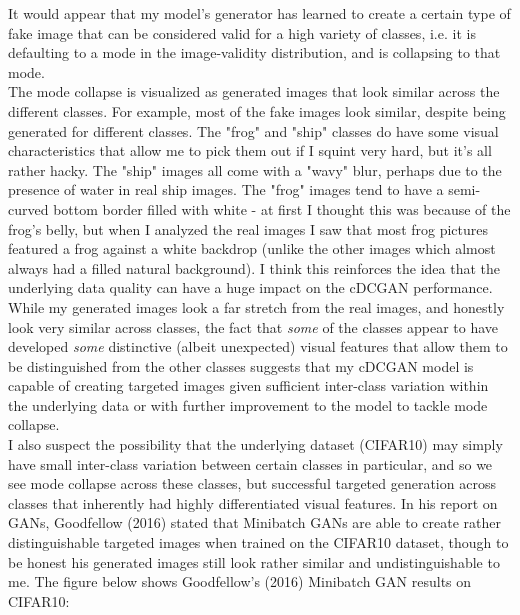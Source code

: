 \documentclass[11pt]{article}
\begin{document}
It would appear that my model's generator has learned to create a
certain type of fake image that can be considered valid for a high
variety of classes, i.e. it is defaulting to a mode in the
image-validity distribution, and is collapsing to that mode.\\

The mode collapse is visualized as generated images that look similar
across the different classes. For example, most of the fake images look
similar, despite being generated for different classes. The "frog" and
"ship" classes do have some visual characteristics that allow me to pick
them out if I squint very hard, but it's all rather hacky. The "ship"
images all come with a "wavy" blur, perhaps due to the presence of water
in real ship images. The "frog" images tend to have a semi-curved bottom
border filled with white - at first I thought this was because of the
frog's belly, but when I analyzed the real images I saw that most frog
pictures featured a frog against a white backdrop (unlike the other
images which almost always had a filled natural background). I think
this reinforces the idea that the underlying data quality can have a
huge impact on the cDCGAN performance.\\

While my generated images look a far stretch from the real images, and
honestly look very similar across classes, the fact that \emph{some} of
the classes appear to have developed \emph{some} distinctive (albeit
unexpected) visual features that allow them to be distinguished from the
other classes suggests that my cDCGAN model is capable of creating
targeted images given sufficient inter-class variation within the
underlying data or with further improvement to the model to tackle mode
collapse.\\

I also suspect the possibility that the underlying dataset (CIFAR10) may
simply have small inter-class variation between certain classes in
particular, and so we see mode collapse across these classes, but
successful targeted generation across classes that inherently had highly
differentiated visual features. In his report on GANs, Goodfellow (2016)
stated that Minibatch GANs are able to create rather distinguishable
targeted images when trained on the CIFAR10 dataset, though to be honest
his generated images still look rather similar and undistinguishable to
me. The figure below shows Goodfellow's (2016) Minibatch GAN results on CIFAR10:

    \begin{center}
    \end{center}
\end{document}
